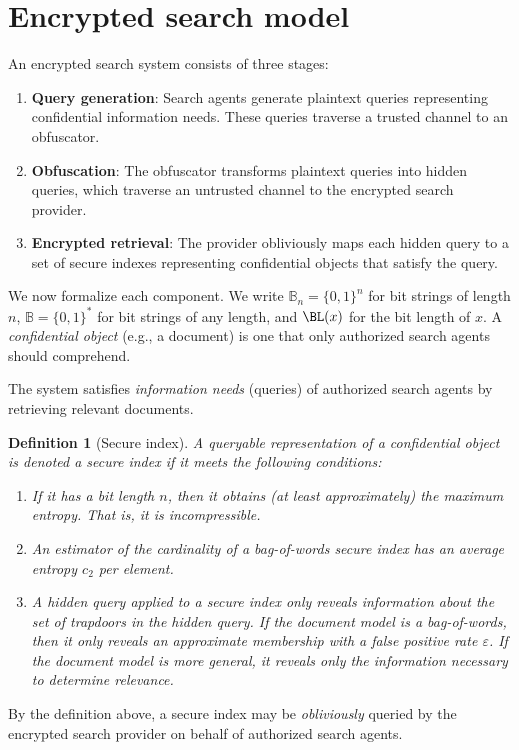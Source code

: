 \documentclass[final,11pt]{article}
\newcommand{\cisb}{\mathbb{B}}
\numberwithin{equation}{section}
\theoremstyle{plain}
\newtheorem{definition}{Definition}[section]
\theoremstyle{remark}
\begin{document}
\section{Encrypted search model}
\label{sec:model}

An encrypted search system consists of three stages:
\begin{enumerate}
    \item \textbf{Query generation}: Search agents generate plaintext queries representing confidential information needs. These queries traverse a trusted channel to an obfuscator.
    \item \textbf{Obfuscation}: The obfuscator transforms plaintext queries into hidden queries, which traverse an untrusted channel to the encrypted search provider.
    \item \textbf{Encrypted retrieval}: The provider obliviously maps each hidden query to a set of secure indexes representing confidential objects that satisfy the query.
\end{enumerate}

We now formalize each component. We write $\cisb_n = \{0,1\}^n$ for bit strings of length $n$, $\cisb = \{0,1\}^*$ for bit strings of any length, and $\BL(x)$ for the bit length of $x$. A \emph{confidential object} (e.g., a document) is one that only authorized search agents should comprehend.

The system satisfies \emph{information needs} (queries) of authorized search agents by retrieving relevant documents.
\begin{definition}[Secure index]
A \emph{queryable} representation of a confidential object is denoted a secure index if it meets the following conditions:
\begin{enumerate}
    \item If it has a bit length $n$, then it obtains (at least approximately) the \emph{maximum entropy}. That is, it is \emph{incompressible}.
    \item An estimator of the cardinality of a \emph{bag-of-words} secure index has an average entropy $c_2$ per element.
    \item A hidden query applied to a secure index only reveals information about the set of trapdoors in the hidden query. If the document model is a bag-of-words, then it only reveals an approximate membership with a false positive rate $\varepsilon$. If the document model is more general, it reveals only the information necessary to determine relevance.
\end{enumerate}
\end{definition}
By the definition above, a secure index may be \emph{obliviously} queried by the encrypted search provider on behalf of authorized search agents.
\end{document}
